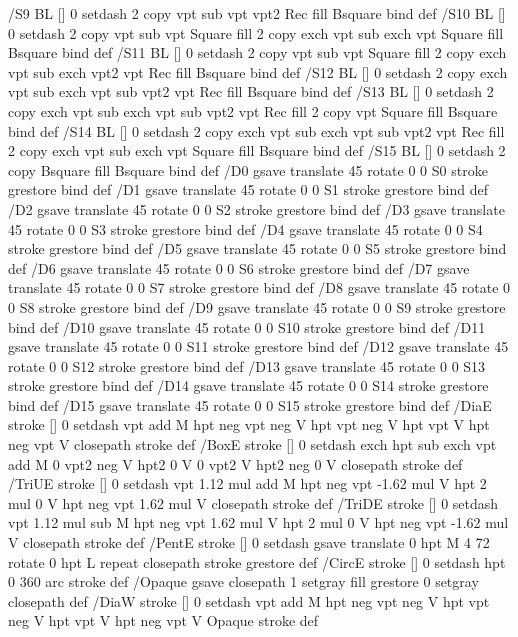 /S9 {BL [] 0 setdash 2 copy vpt sub vpt vpt2 Rec fill Bsquare} bind def
/S10 {BL [] 0 setdash 2 copy vpt sub vpt Square fill 2 copy exch vpt sub exch vpt Square fill
	Bsquare} bind def
/S11 {BL [] 0 setdash 2 copy vpt sub vpt Square fill 2 copy exch vpt sub exch vpt2 vpt Rec fill
	Bsquare} bind def
/S12 {BL [] 0 setdash 2 copy exch vpt sub exch vpt sub vpt2 vpt Rec fill Bsquare} bind def
/S13 {BL [] 0 setdash 2 copy exch vpt sub exch vpt sub vpt2 vpt Rec fill
	2 copy vpt Square fill Bsquare} bind def
/S14 {BL [] 0 setdash 2 copy exch vpt sub exch vpt sub vpt2 vpt Rec fill
	2 copy exch vpt sub exch vpt Square fill Bsquare} bind def
/S15 {BL [] 0 setdash 2 copy Bsquare fill Bsquare} bind def
/D0 {gsave translate 45 rotate 0 0 S0 stroke grestore} bind def
/D1 {gsave translate 45 rotate 0 0 S1 stroke grestore} bind def
/D2 {gsave translate 45 rotate 0 0 S2 stroke grestore} bind def
/D3 {gsave translate 45 rotate 0 0 S3 stroke grestore} bind def
/D4 {gsave translate 45 rotate 0 0 S4 stroke grestore} bind def
/D5 {gsave translate 45 rotate 0 0 S5 stroke grestore} bind def
/D6 {gsave translate 45 rotate 0 0 S6 stroke grestore} bind def
/D7 {gsave translate 45 rotate 0 0 S7 stroke grestore} bind def
/D8 {gsave translate 45 rotate 0 0 S8 stroke grestore} bind def
/D9 {gsave translate 45 rotate 0 0 S9 stroke grestore} bind def
/D10 {gsave translate 45 rotate 0 0 S10 stroke grestore} bind def
/D11 {gsave translate 45 rotate 0 0 S11 stroke grestore} bind def
/D12 {gsave translate 45 rotate 0 0 S12 stroke grestore} bind def
/D13 {gsave translate 45 rotate 0 0 S13 stroke grestore} bind def
/D14 {gsave translate 45 rotate 0 0 S14 stroke grestore} bind def
/D15 {gsave translate 45 rotate 0 0 S15 stroke grestore} bind def
/DiaE {stroke [] 0 setdash vpt add M
  hpt neg vpt neg V hpt vpt neg V
  hpt vpt V hpt neg vpt V closepath stroke} def
/BoxE {stroke [] 0 setdash exch hpt sub exch vpt add M
  0 vpt2 neg V hpt2 0 V 0 vpt2 V
  hpt2 neg 0 V closepath stroke} def
/TriUE {stroke [] 0 setdash vpt 1.12 mul add M
  hpt neg vpt -1.62 mul V
  hpt 2 mul 0 V
  hpt neg vpt 1.62 mul V closepath stroke} def
/TriDE {stroke [] 0 setdash vpt 1.12 mul sub M
  hpt neg vpt 1.62 mul V
  hpt 2 mul 0 V
  hpt neg vpt -1.62 mul V closepath stroke} def
/PentE {stroke [] 0 setdash gsave
  translate 0 hpt M 4 {72 rotate 0 hpt L} repeat
  closepath stroke grestore} def
/CircE {stroke [] 0 setdash 
  hpt 0 360 arc stroke} def
/Opaque {gsave closepath 1 setgray fill grestore 0 setgray closepath} def
/DiaW {stroke [] 0 setdash vpt add M
  hpt neg vpt neg V hpt vpt neg V
  hpt vpt V hpt neg vpt V Opaque stroke} def

